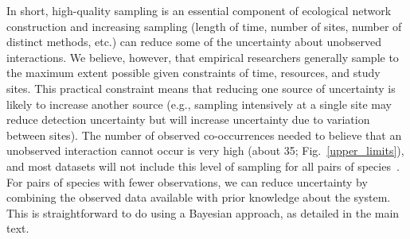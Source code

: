 \documentclass[12pt]{article}
\begin{document}
        In short, high-quality sampling is an essential component of ecological network construction and increasing sampling (length of time, number of sites, number of distinct methods, etc.) can reduce some of the uncertainty about unobserved interactions. We believe, however, that empirical researchers generally sample to the maximum extent possible given constraints of time, resources, and study sites. This practical constraint means that reducing one source of uncertainty is likely to increase another source (e.g., sampling intensively at a single site may reduce detection uncertainty but will increase uncertainty due to variation between sites). The number of observed co-occurrences needed to believe that an unobserved interaction cannot occur is very high (about 35; Fig.~\ref{upper_limits}), and most datasets will not include this level of sampling for all pairs of species~\citep{Bartomeus2013}. For pairs of species with fewer observations, we can reduce uncertainty by combining the observed data available with prior knowledge about the system. This is straightforward to do using a Bayesian approach, as detailed in the main text.
\end{document}

